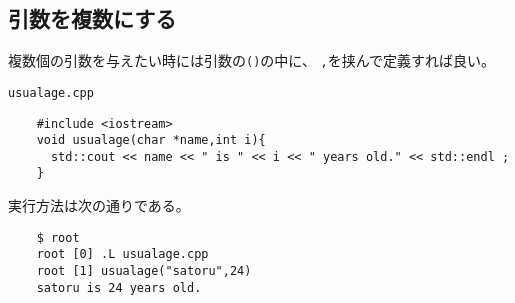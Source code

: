   \subsection{引数を複数にする}
  複数個の引数を与えたい時には引数の\verb|()|の中に、
  \verb|,|を挟んで定義すれば良い。
  \begin{itembox}{\texttt{usualage.cpp}}
\begin{verbatim}
	#include <iostream>
	void usualage(char *name,int i){
	  std::cout << name << " is " << i << " years old." << std::endl ;
	}
\end{verbatim}
  \end{itembox}
  実行方法は次の通りである。
\begin{verbatim}
	$ root
	root [0] .L usualage.cpp 
	root [1] usualage("satoru",24)
	satoru is 24 years old.
\end{verbatim}